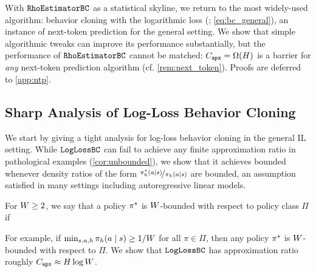 


With $\texttt{RhoEstimatorBC}$ as a statistical skyline, we return to the most widely-used \IL{} algorithm: behavior cloning with the logarithmic loss (\loglossbc; \cref{eq:bc_general}), an instance of next-token prediction for the general \IL{} setting.
We show that simple algorithmic tweaks can improve its performance substantially, but the performance of $\texttt{RhoEstimatorBC}$ cannot be matched: $C_{\texttt{apx}} = \Omega(H)$ is a barrier for \emph{any} next-token prediction algorithm (cf. \cref{rem:next_token}). Proofs are deferred to \cref{app:ntp}.

\subsection{Sharp Analysis of Log-Loss Behavior Cloning}
\label{sec:logloss}


We start by giving a tight analysis for log-loss behavior cloning in the general IL setting.
While $\texttt{LogLossBC}$ can fail to achieve any finite approximation ratio in pathological examples (\cref{cor:unbounded}), we show that it achieves bounded  whenever density ratios of the form $\nicefrac{\pi^{\star}_h(a\mid{}s)}{\pi_h(a\mid{}s)}$ are bounded, an assumption satisfied in many settings including autoregressive linear models.\loose %

\begin{definition}\label{ass:density-bound}
For $W \geq 2$, we say that a policy $\pi^{\star}$ is $W$-bounded with respect to policy class $\Pi$ if 
\end{definition}

For example, if $\min_{s,a,h}\pi_h(a\mid{}s) \geq 1/W$ for all $\pi\in\Pi$, then any policy $\pi^{\star}$ is $W$-bounded with respect to $\Pi$. We show that $\texttt{LogLossBC}$ has approximation ratio roughly $C_{\texttt{apx}} \approx H\log W$.\loose

